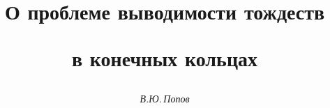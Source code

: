 

 


%


\newcommand{\tts}[1]{} 


\renewcommand{\baselinestretch}{1.04}


 




\setcounter{page}{51} 












 


\author{\it В.Ю.\,Попов} 




\title{О проблеме выводимости тождеств 


в конечных кольцах} 


 


\date{} 




\pagestyle{plain} %


 




\maketitle 


\label{begin} 


 


 


